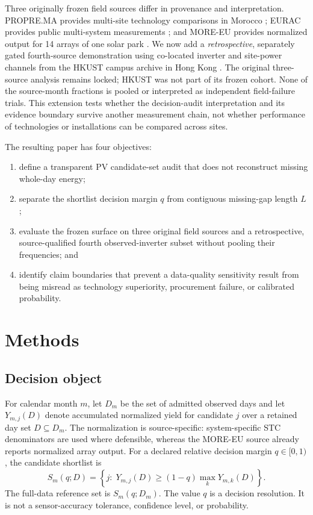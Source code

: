 \documentclass[preprint,12pt]{elsarticle}
\begin{document}
Three originally frozen field sources differ in provenance and interpretation. PROPRE.MA provides multi-site technology comparisons in Morocco \cite{bennouna2019}; EURAC provides public multi-system measurements \cite{eurac2026}; and MORE-EU provides normalized output for 14 arrays of one solar park \cite{moreeu2026}. We now add a \emph{retrospective}, separately gated fourth-source demonstration using co-located inverter and site-power channels from the HKUST campus archive in Hong Kong \cite{lin2025,hkust2024}. The original three-source analysis remains locked; HKUST was not part of its frozen cohort. None of the source-month fractions is pooled or interpreted as independent field-failure trials. This extension tests whether the decision-audit interpretation and its evidence boundary survive another measurement chain, not whether performance of technologies or installations can be compared across sites.

The resulting paper has four objectives:
\begin{enumerate}[leftmargin=1.5em]
    \item define a transparent PV candidate-set audit that does not reconstruct missing whole-day energy;
    \item separate the shortlist decision margin $q$ from contiguous missing-gap length $L$;
    \item evaluate the frozen surface on three original field sources and a retrospective, source-qualified fourth observed-inverter subset without pooling their frequencies; and
    \item identify claim boundaries that prevent a data-quality sensitivity result from being misread as technology superiority, procurement failure, or calibrated probability.
\end{enumerate}

\section{Methods}
\subsection{Decision object}
For calendar month $m$, let $D_m$ be the set of admitted observed days and let $Y_{m,j}(D)$ denote accumulated normalized yield for candidate $j$ over a retained day set $D\subseteq D_m$. The normalization is source-specific: system-specific STC denominators are used where defensible, whereas the MORE-EU source already reports normalized array output. For a declared relative decision margin $q\in[0,1)$, the candidate shortlist is
\begin{equation}
S_m(q;D)=\left\{j:\;Y_{m,j}(D)\geq (1-q)\max_k Y_{m,k}(D)\right\}.
\label{eq:shortlist}
\end{equation}
The full-data reference set is $S_m(q;D_m)$. The value $q$ is a decision resolution. It is not a sensor-accuracy tolerance, confidence level, or probability.
\end{document}
